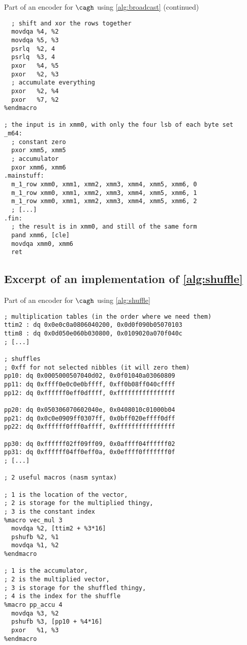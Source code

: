 {\small
\begin{listing}[!htb]
\begin{center}
\caption{Part of an encoder for $\cagh$ using \autoref{alg:broadcast} (continued)}
\begin{verbatim}
  ; shift and xor the rows together
  movdqa %4, %2
  movdqa %5, %3
  psrlq  %2, 4
  psrlq  %3, 4
  pxor   %4, %5
  pxor   %2, %3
  ; accumulate everything
  pxor   %2, %4 
  pxor   %7, %2
%endmacro

; the input is in xmm0, with only the four lsb of each byte set
_m64:
  ; constant zero
  pxor xmm5, xmm5
  ; accumulator
  pxor xmm6, xmm6
.mainstuff:
  m_1_row xmm0, xmm1, xmm2, xmm3, xmm4, xmm5, xmm6, 0
  m_1_row xmm0, xmm1, xmm2, xmm3, xmm4, xmm5, xmm6, 1
  m_1_row xmm0, xmm1, xmm2, xmm3, xmm4, xmm5, xmm6, 2
  ; [...]
.fin:
  ; the result is in xmm0, and still of the same form
  pand xmm6, [cle]
  movdqa xmm0, xmm6
  ret
\end{verbatim}
\end{center}
\end{listing}
}
  


\FloatBarrier

\subsection{Excerpt of an implementation of \autoref{alg:shuffle}}
\label{app:spec}
{\small
\begin{listing}[!htb]
\begin{center}
\caption{Part of an encoder for $\cagh$ using \autoref{alg:shuffle}}
\begin{verbatim}
; multiplication tables (in the order where we need them)
ttim2 : dq 0x0e0c0a0806040200, 0x0d0f090b05070103
ttim8 : dq 0x0d050e060b030800, 0x0109020a070f040c
; [...]

; shuffles
; 0xff for not selected nibbles (it will zero them)
pp10: dq 0x0005000507040d02, 0x0f01040a03060809
pp11: dq 0xffff0e0c0e0bffff, 0xff0b08ff040cffff 
pp12: dq 0xffffff0eff0dffff, 0xffffffffffffffff

pp20: dq 0x050306070602040e, 0x0408010c01000b04
pp21: dq 0x0c0e0909ff0307ff, 0x0bff020effff0dff
pp22: dq 0xffffff0fff0affff, 0xffffffffffffffff

pp30: dq 0xffffff02ff09ff09, 0x0affff04ffffff02
pp31: dq 0xffffff04ff0eff0a, 0x0effff0fffffff0f
; [...]

; 2 useful macros (nasm syntax)

; 1 is the location of the vector,
; 2 is storage for the multiplied thingy,
; 3 is the constant index
%macro vec_mul 3
  movdqa %2, [ttim2 + %3*16]
  pshufb %2, %1
  movdqa %1, %2
%endmacro

; 1 is the accumulator,
; 2 is the multiplied vector,
; 3 is storage for the shuffled thingy,
; 4 is the index for the shuffle
%macro pp_accu 4
  movdqa %3, %2
  pshufb %3, [pp10 + %4*16]
  pxor   %1, %3
%endmacro

\end{verbatim}
\end{center}
\end{listing}
}

